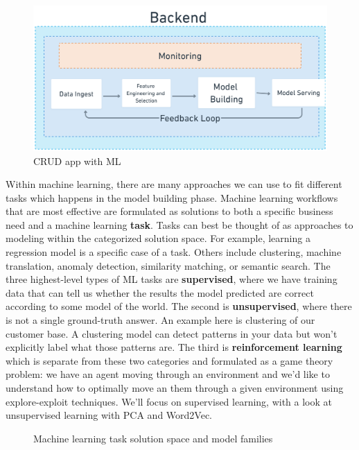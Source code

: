 \documentclass[11pt, table]{diazessay} %
\begin{document}
\begin{sloppypar}
\begin{figure}[H]
\centering
\includegraphics[width=1\textwidth]{figures/ml_system.png}
\caption{CRUD app with ML}
\end{figure} 

Within machine learning, there are many approaches we can use to fit different tasks which happens in the model building phase.  Machine learning workflows that are most effective are formulated as solutions to both a specific business need and a machine learning \textbf{task}. Tasks can best be thought of as approaches to modeling within the categorized solution space. For example, learning a regression model is a specific case of a task. Others include clustering, machine translation, anomaly detection, similarity matching, or semantic search.  The  three highest-level types of ML tasks are  \textbf{supervised}, where we have training data that can tell us whether the results the model predicted are correct according to some model of the world. The second is \textbf{unsupervised}, where there is not a single ground-truth answer. An example here is clustering of our customer base. A clustering model can detect patterns in your data but won't explicitly label what those patterns are. The third is \textbf{reinforcement learning}  which is separate from these two categories and formulated as a game theory problem: we have an agent moving through an environment and we'd like to understand how to optimally move an them through a given environment using explore-exploit techniques. We'll focus on supervised learning, with a look at unsupervised learning with PCA and Word2Vec.
 
\begin{figure}[H]
    \centering
     \caption{Machine learning task solution space and model families}
\end{figure}



\end{sloppypar}
\end{document}
